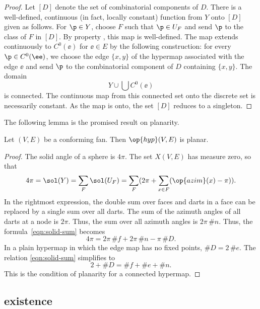 \begin{proof} Let $[D]$ denote the set of combinatorial components of
  $D$.  There is a well-defined, continuous (in fact, locally
  constant) function from $Y$ onto $[D]$ given as follows.  For $\p\in
  Y$, choose $F$ such that $\p\in U_F$ and send $\p$ to the class of
  $F$ in $[D]$.  By property , this map is
  well-defined.  The map extends continuously to $C^0(\ee)$ for
  $\ee\in E$ by the following construction: for every $\p\in
  C^0(\ee)$, we choose the edge $\{x,y\}$ of the hypermap associated
  with the edge $\ee$ and send $\p$ to the combinatorial component of
  $D$ containing $\{x,y\}$. The domain
\[ 
Y\cup \bigcup C^0(\ee)
\] 
is connected.  The continuous map from this connected set onto the
discrete set is necessarily constant.  As the map is onto, the set
$[D]$ reduces to a singleton.
\end{proof}

The following lemma is the promised result on planarity.

\begin{lemma}[]  
\label{lemma:cfplanar}
Let $(V,E)$ be a conforming fan.  
Then $\op{hyp}(V,E)$ is planar.
\end{lemma}
%
%

\begin{proof}  The solid angle of a sphere is $4\pi$.  The set $X(V,E)$
has measure zero, so that
\begin{equation}\label{eqn:solid-sum}
4\pi = \sol(Y)= \sum_F \sol(U_F) = 
\sum_F ( 2\pi + \sum_{x\in F} (\op{azim}(x)-\pi) ).
\end{equation}
In the rightmost expression, the double sum over faces and darts in a
face can be replaced by a single sum over all darts.  The sum of the
azimuth angles of all darts at a node is $2\pi$. Thus, the sum over all azimuth
angles is $2\pi\,\#n$.  Thus, the formula~\eqref{eqn:solid-sum}
becomes
\[ 
4\pi = 2\pi\, \#f +2\pi\,\#n - \pi\, \#D.
\] 
In a plain hypermap in which the edge map has no fixed points, $\#D =
2\,\#e$.  The relation \eqref{eqn:solid-sum} simplifies to
\[ 
2 + \#D = \#f + \#e + \#n.
\] 
This is the condition of planarity for a connected hypermap.
\end{proof}
%

\subsection{existence}




